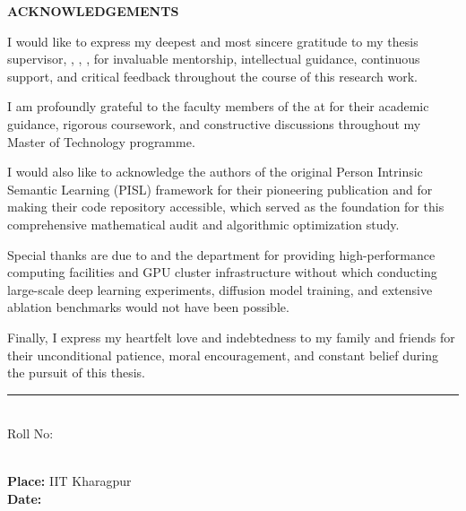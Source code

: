 \thispagestyle{plain}

\begin{center}
 \Large {\bf \uppercase{Acknowledgements}}
\end{center}

\vspace{3\baselineskip}

\noindent
I would like to express my deepest and most sincere gratitude to my thesis supervisor, \textbf{\mysupervisor}, \mydep, \myinst, for invaluable mentorship, intellectual guidance, continuous support, and critical feedback throughout the course of this research work.

\noindent
I am profoundly grateful to the faculty members of the \mydep{} at \myinst{} for their academic guidance, rigorous coursework, and constructive discussions throughout my Master of Technology programme.

\noindent
I would also like to acknowledge the authors of the original Person Intrinsic Semantic Learning (PISL) framework for their pioneering publication and for making their code repository accessible, which served as the foundation for this comprehensive mathematical audit and algorithmic optimization study.

\noindent
Special thanks are due to \myinst{} and the department for providing high-performance computing facilities and GPU cluster infrastructure without which conducting large-scale deep learning experiments, diffusion model training, and extensive ablation benchmarks would not have been possible.

\noindent
Finally, I express my heartfelt love and indebtedness to my family and friends for their unconditional patience, moral encouragement, and constant belief during the pursuit of this thesis.

\vspace{3\baselineskip}

\begin{flushright}
\begin{minipage}[c]{0.5\textwidth}
\centering
\hrule 
\vspace{0.5\baselineskip}
{\large \bf \myname} \\
Roll No: \myrollno \\
\mydep \\
\myinst
\end{minipage}
\end{flushright}

\vspace{\baselineskip}
\noindent
{\large \bf Place: } IIT Kharagpur \\
{\large \bf Date: } \mydegreedate
